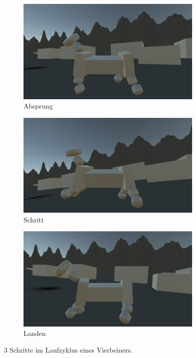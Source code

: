 \begin{figure}
	\centering
	\begin{subfigure}[b]{0.3\textwidth}
		\centering
		\includegraphics[width=\textwidth]{resources/img/4B_Absprung.png}
		\caption{Absprung}
		\label{fig:4B_Absprung}
	\end{subfigure}
	\hfill
	\begin{subfigure}[b]{0.3\textwidth}
		\centering
		\includegraphics[width=\textwidth]{resources/img/4B_Schritt.png}
		\caption{Schritt}
		\label{fig:4B_Schritt}
	\end{subfigure}
	\hfill
	\begin{subfigure}[b]{0.3\textwidth}
		\centering
		\includegraphics[width=\textwidth]{resources/img/4B_Landen.png}
		\caption{Landen}
		\label{fig:4B_Landen}
	\end{subfigure}
	\caption{3 Schritte im Laufzyklus eines Vierbeiners.}
	\label{fig:4BLaufen}
\end{figure}

